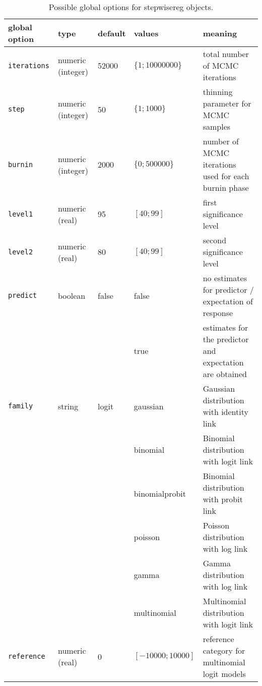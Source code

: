 \begin{table}[ht] \footnotesize
\begin{center}
\begin{tabular}{|p{2.5cm}|p{1.5cm}|p{1.5cm}|p{2cm}|p{6cm}|}
\hline
{\bf global option} & {\bf type} & {\bf default} & {\bf values} & {\bf meaning} \\
\hline \hline
{\tt iterations}  & numeric \newline (integer) & 52000 & $\{1;10000000\}$ & total number of MCMC iterations \\
\hline
{\tt step}  & numeric \newline (integer) & 50 & $\{1;1000\}$ & thinning parameter for MCMC samples \\
\hline
{\tt burnin}  & numeric \newline (integer) & 2000 & $\{0;500000\}$ & number of MCMC iterations used for each burnin phase \\
\hline
{\tt level1}  & numeric \newline (real) & 95 & $[40;99]$ & first significance level \\
\hline
{\tt level2}  & numeric \newline (real) & 80 & $[40;99]$ & second significance level \\
\hline
{\tt predict}  & boolean  & false & false & no estimates for predictor / expectation of response \\
               &          &       & true  & estimates for the predictor and expectation are obtained \\
\hline
{\tt family}     & string  & logit     & gaussian    & Gaussian distribution with identity link \\
                 &         &           & binomial    & Binomial distribution with logit link \\
                 &         &           & binomialprobit & Binomial distribution with probit link \\
                 &         &           & poisson     & Poisson distribution with log link \\
                 &         &           & gamma       & Gamma distribution with log link \\
                 &         &           & multinomial & Multinomial distribution with logit link \\
\hline
{\tt reference}  & numeric \newline (real)  & 0     & $[-10000;10000]$    & reference category for multinomial logit models \\
\hline
\end{tabular}
{\em\caption {\label{stewpisereg_globaloptions2} Possible global options
for stepwisereg objects.}}
\end{center}
\end{table}


